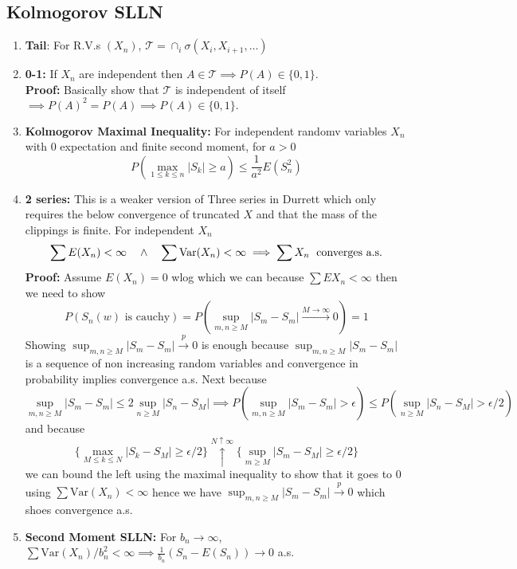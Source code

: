 \documentclass{article}
\begin{document}
\subsection*{Kolmogorov SLLN}

\begin{enumerate}
    \item \textbf{Tail}: For R.V.s \((X_n)\), \(\mathcal{T} = \cap_i \sigma(X_i, X_{i+1}, \dots)\)

    \item \textbf{0-1:} If \(X_n\) are independent then \(A \in \mathcal{T} \implies P(A) \in \{0,1\}.\)\\
    \textbf{Proof:} Basically show that \(\mathcal{T}\) is independent of itself \(\implies P(A)^2 = P(A)\implies P(A) \in \{0,1\}.\)

    \item \textbf{Kolmogorov Maximal Inequality:} For independent randomv variables \(X_n\) with 0 expectation and finite second moment, for \(a>0\)
    \[
    P\left(\max_{1\leq k\leq n}|S_k|\geq a\right) \leq \frac{1}{a^2}E(S_n^2)
    \]

    \item \textbf{2 series:} This is a weaker version of Three series in Durrett which only requires the below convergence of truncated \(X\) and that the mass of the clippings is finite. For independent \(X_n\)
    \[
    \sum E(X_n) < \infty \quad \wedge \quad \sum \text{Var}(X_n) < \infty \implies \sum X_n \text{\; converges a.s.}
    \]
    \textbf{Proof:} Assume \(E(X_n) = 0 \) wlog which we can because \(\sum EX_n < \infty\) then we need to show 
    \[
    P(S_n(w) \text{ is cauchy}) = P(\sup_{m,n\geq M} |S_m-S_m| \overset{M\to\infty}{\to} 0) = 1
    \]
    Showing \(\sup_{m,n\geq M} |S_m-S_m| \overset{p}{\to} 0\) is enough because \(\sup_{m,n\geq M} |S_m-S_m|\) is a sequence of non increasing random variables and convergence in probability implies convergence a.s. Next because 
    \[
    \sup_{m,n\geq M} |S_m-S_m| \leq 2\sup_{n\geq M}|S_n-S_M| \implies P(\sup_{m,n\geq M} |S_m-S_m|>\epsilon) \leq P(\sup_{n\geq M}|S_n-S_M|>\epsilon/2)
    \]
    and because 
    \[
    \{\max_{M\leq k\leq N}|S_k - S_M| \geq \epsilon/2\} \overset{N\uparrow \infty}{\uparrow} \{\sup_{m\geq M} |S_m - S_M| \geq \epsilon/2\}
    \]
    we can bound the left using the maximal inequality to show that it goes to 0 using \(\sum \text{Var}(X_n) < \infty\) hence we have \(\sup_{m,n\geq M} |S_m-S_m| \overset{p}{\to} 0\) which shoes convergence a.s. 

    \item \textbf{Second Moment SLLN:} For \(b_n \to \infty\), \(\sum \text{Var}(X_n)/b^2_n < \infty \implies \frac{1}{b_n}(S_n - E(S_n)) \to 0 \) a.s.\\


\end{enumerate}
\end{document}
